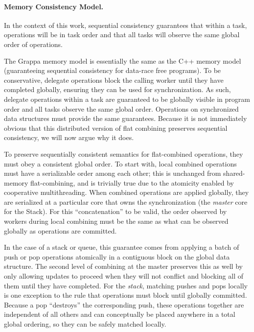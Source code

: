 \paragraph{Memory Consistency Model.}
\label{sec:memory-model}
In the context of this work, sequential consistency guarantees that within a
task, operations will be in task order and that all tasks will observe the
same global order of operations.

The Grappa memory model is essentially the same as the C++ memory
model~\cite{boehm:drf0,N2480,N2800} (guaranteeing sequential
consistency for data-race free programs). To be conservative, delegate
operations block the calling worker until they have completed globally,
ensuring they can be used for synchronization. As such, delegate operations
within a task are guaranteed to be globally visible in program order and all
tasks observe the same global order.
Operations on synchronized data structures must provide the same guarantees.
Because it is not immediately obvious
that this distributed version of flat combining preserves sequential
consistency, we will now argue why it does.

To preserve sequentially consistent semantics for flat-combined operations, they must obey a consistent global order.
To start with, local combined operations must have a serializable order among each other; this is unchanged from shared-memory flat-combining, and is trivially true due to the atomicity enabled by cooperative multithreading.
When combined operations are applied globally, they are serialized at a particular core that owns the synchronization (the \emph{master} core for the Stack).
For this ``concatenation'' to be valid, the order observed by workers during local combining must be the same as what can be observed globally as operations are committed.

In the case of a stack or queue, this guarantee comes from applying a batch of push or pop operations atomically in a contiguous block on the global data structure. The second level of combining at the master preserves this as well by only allowing updates to proceed when they will not conflict and blocking all of them until they have completed.
For the \emph{stack}, matching pushes and pops locally is one exception to the rule that operations must block until globally committed. Because a pop ``destroys'' the corresponding push, these operations together are independent of all others and can conceptually be placed anywhere in a total global ordering, so they can be safely matched locally.

